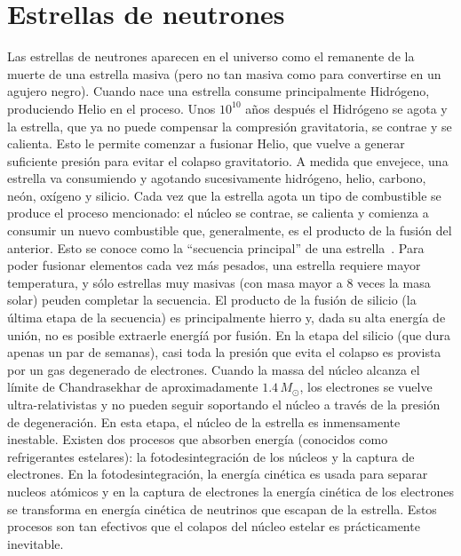 \section{Estrellas de neutrones}\label{sc:intro}

Las estrellas de neutrones aparecen en el universo como el remanente de la muerte de una estrella masiva (pero no tan masiva como para convertirse en un agujero negro).
Cuando nace una estrella consume principalmente Hidrógeno, produciendo Helio en el proceso.
Unos $10^{10}$ años después el Hidrógeno se agota y la estrella, que ya no puede compensar la compresión gravitatoria, se contrae y se calienta.
Esto le permite comenzar a fusionar Helio, que vuelve a generar suficiente presión para evitar el colapso gravitatorio.
A medida que envejece, una estrella va consumiendo y agotando sucesivamente hidrógeno, helio, carbono, neón, oxígeno y silicio.
Cada vez que la estrella agota un tipo de combustible se produce el proceso mencionado: el núcleo se contrae, se calienta y comienza a consumir un nuevo combustible que, generalmente, es el producto de la fusión del anterior.
Esto se conoce como la ``secuencia principal'' de una estrella~\cite{woosley_physics_2005}.
Para poder fusionar elementos cada vez más pesados, una estrella requiere mayor temperatura, y sólo estrellas muy masivas (con masa mayor a 8 veces la masa solar) peuden completar la secuencia.
El producto de la fusión de silicio (la última etapa de la secuencia) es principalmente hierro y, dada su alta energía de unión, no es posible extraerle energíá por fusión.
En la etapa del silicio (que dura apenas un par de semanas), casi toda la presión que evita el colapso es provista por un gas degenerado de electrones.
Cuando la massa del núcleo alcanza el límite de Chandrasekhar de aproximadamente $1.4\,M_\odot$, los electrones se vuelve ultra-relativistas y no pueden seguir soportando el núcleo a través de la presión de degeneración.
En esta etapa, el núcleo de la estrella es inmensamente inestable.
Existen dos procesos que absorben energía (conocidos como refrigerantes estelares): la fotodesintegración de los núcleos y la captura de electrones.
En la fotodesintegración, la energía cinética es usada para separar nucleos atómicos y en la captura de electrones la energía cinética de los electrones se transforma en energía cinética de neutrinos que escapan de la estrella.
Estos procesos son tan efectivos que el colapos del núcleo estelar es prácticamente inevitable.

